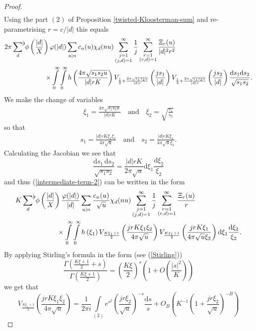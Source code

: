 \documentclass[a4paper,10pt,twoside]{amsart}
\theoremstyle{definition}
\numberwithin{equation}{section}
\renewcommand\:{\colon}
\newcommand{\sumflat}{\mathop{{\sum}^{\raisebox{-3pt}{\makebox[0pt][l]{$\flat$}}}}}
\begin{document}
\begin{proof}
\begin{align*}
\end{align*}
Using the part $(2)$ of Proposition \ref{twisted-Kloosterman-sum} and re-parametrising $r=c/|d|$ this equals
\begin{align}\label{intermediate-term-2}
&2\pi \sumflat_d\,\phi\left(\frac{|d|}X\right)\varphi(|d|)\sum_{u|n}c_n(u)\chi_d(nu)\sum_{\substack{j=1\\(j,d)=1}}^\infty\frac1j\sum_{\substack{r=1\\
(r,d)=1}}^\infty\frac{\Xi_r(u)}{|d|^2r^2}\\
&\qquad\qquad\qquad\times\int\limits_0^\infty\int\limits_0^\infty h\left(\frac{4\pi\sqrt{s_1s_2u}}{|d|rK}\right)V_{\frac12+\frac{2\pi\sqrt{s_1s_2u}}{|d|r}}\left(\frac{js_1}{|d|}\right)V_{\frac12+\frac{2\pi\sqrt{s_1s_2u}}{|d|r}}\left(\frac{js_2}{|d|}\right)\frac{\mathrm d s_1 \mathrm d s_2}{\sqrt{s_1s_2}}. \nonumber
\end{align}
We make the change of variables
\begin{align*}
\xi_1=\frac{4\pi\sqrt{s_1s_2u}}{|d|rK} \quad \text{and} \quad \xi_2=\sqrt{\frac{s_1}{s_2}}
\end{align*}
so that 
\begin{align*}
s_1=\frac{|d|rK\xi_1\xi_2}{4\pi\sqrt u} \quad \text{and} \quad s_2=\frac{|d|rK\xi_1}{4\pi\sqrt u \xi_2}.
\end{align*}
Calculating the Jacobian we see that 
\[
\frac{\mathrm d s_1\,\mathrm d s_2}{\sqrt{s_1s_2}}=\frac{|d|rK}{2\pi \sqrt u}\mathrm d \xi_1\frac{\mathrm d \xi_2}{\xi_2}
\]
and thus (\ref{intermediate-term-2}) can be written in the form
\begin{align}\label{intermediate-form}
&K\sumflat_d\,\phi\left(\frac{|d|}X\right)\frac{\varphi(|d|)}{|d|}\sum_{u|n}\frac{c_n(u)}{\sqrt u}\chi_d(nu)\sum_{\substack{j=1\\(j,d)=1}}^\infty\frac1j\sum_{\substack{r=1\\
(r,d)=1}}^\infty\frac{\Xi_r(u)}{r}\\
&\qquad\qquad\qquad\times\int\limits_0^\infty\int\limits_0^\infty h\left(\xi_1\right)V_{\frac{K\xi_1+1}2}\left(\frac{jrK\xi_1\xi_2}{4\pi\sqrt u}\right)V_{\frac{K\xi_1+1}2}\left(\frac{jrK\xi_1}{4\pi\sqrt u\xi_2}\right)\mathrm d \xi_1\frac{\mathrm d \xi_2}{\xi_2}. \nonumber
\end{align}
By applying Stirling's formula in the form (see (\ref{Stirling}))
\[
\frac{\Gamma\left(\frac{K\xi+1}2+s\right)}{\Gamma\left(\frac{K\xi+1}2\right)}=\left(\frac{K\xi}2\right)^s\left(1+O\left(\frac{|s|^2}K\right)\right)
\]
we get that 
\[
V_{\frac{K\xi_1+1}2}\left(\frac{jrK\xi_1\xi_2}{4\pi\sqrt u}\right)=\frac1{2\pi i}\int\limits_{(2)}e^{s^2}\left(\frac{jr\xi_2}{\sqrt u}\right)^{-s}\frac{\mathrm d s}s+O_B\left(K^{-1}\left(1+\frac{jr\xi_2}{\sqrt u}\right)^{-B} \right)
\]
\end{proof}
\end{document}

